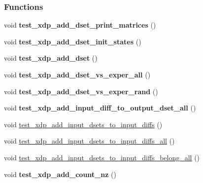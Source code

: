 \subsubsection*{\-Functions}
\begin{DoxyCompactItemize}
\item 
\hypertarget{xdp-add-diff-set-tests_8cc_acbfef1695f6f1d1ad36d10df9de21348}{void {\bfseries test\-\_\-xdp\-\_\-add\-\_\-dset\-\_\-print\-\_\-matrices} ()}\label{xdp-add-diff-set-tests_8cc_acbfef1695f6f1d1ad36d10df9de21348}

\item 
\hypertarget{xdp-add-diff-set-tests_8cc_a2786178648ae0c20e4f5c01b3344d1e5}{void {\bfseries test\-\_\-xdp\-\_\-add\-\_\-dset\-\_\-init\-\_\-states} ()}\label{xdp-add-diff-set-tests_8cc_a2786178648ae0c20e4f5c01b3344d1e5}

\item 
\hypertarget{xdp-add-diff-set-tests_8cc_a25e8c154c7b16ec5ec71a788f814a06f}{void {\bfseries test\-\_\-xdp\-\_\-add\-\_\-dset} ()}\label{xdp-add-diff-set-tests_8cc_a25e8c154c7b16ec5ec71a788f814a06f}

\item 
\hypertarget{xdp-add-diff-set-tests_8cc_a8201fac027509977491f5b08931d8fc3}{void {\bfseries test\-\_\-xdp\-\_\-add\-\_\-dset\-\_\-vs\-\_\-exper\-\_\-all} ()}\label{xdp-add-diff-set-tests_8cc_a8201fac027509977491f5b08931d8fc3}

\item 
\hypertarget{xdp-add-diff-set-tests_8cc_a266c4817b6997a7f3fe90d28566b389d}{void {\bfseries test\-\_\-xdp\-\_\-add\-\_\-dset\-\_\-vs\-\_\-exper\-\_\-rand} ()}\label{xdp-add-diff-set-tests_8cc_a266c4817b6997a7f3fe90d28566b389d}

\item 
\hypertarget{xdp-add-diff-set-tests_8cc_aca99f958e59cf5a3a55c88972a231630}{void {\bfseries test\-\_\-xdp\-\_\-add\-\_\-input\-\_\-diff\-\_\-to\-\_\-output\-\_\-dset\-\_\-all} ()}\label{xdp-add-diff-set-tests_8cc_aca99f958e59cf5a3a55c88972a231630}

\item 
void \hyperlink{xdp-add-diff-set-tests_8cc_acf0af7bb54fe38b0549943e7b797a931}{test\-\_\-xdp\-\_\-add\-\_\-input\-\_\-dsets\-\_\-to\-\_\-input\-\_\-diffs} ()
\item 
void \hyperlink{xdp-add-diff-set-tests_8cc_af9ab51c04055bc38ab2ddfe2c6087353}{test\-\_\-xdp\-\_\-add\-\_\-input\-\_\-dsets\-\_\-to\-\_\-input\-\_\-diffs\-\_\-all} ()
\item 
void \hyperlink{xdp-add-diff-set-tests_8cc_a9875c03c825fd7a841fe04533daddaf5}{test\-\_\-xdp\-\_\-add\-\_\-input\-\_\-dsets\-\_\-to\-\_\-input\-\_\-diffs\-\_\-belong\-\_\-all} ()
\item 
\hypertarget{xdp-add-diff-set-tests_8cc_a5e663008f85e2fb364a9f3b045de4885}{void {\bfseries test\-\_\-xdp\-\_\-add\-\_\-count\-\_\-nz} ()}\label{xdp-add-diff-set-tests_8cc_a5e663008f85e2fb364a9f3b045de4885}


\end{DoxyCompactItemize}
